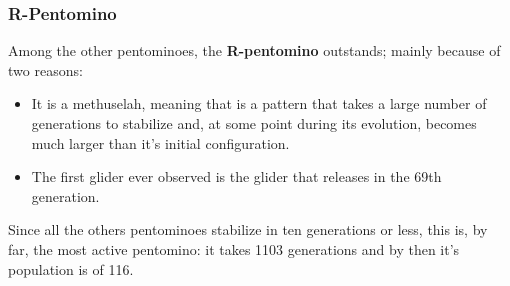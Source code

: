 \subsubsection{R-Pentomino}
Among the other pentominoes, the \textbf{R-pentomino} outstands; mainly because
of two reasons:
	\begin{itemize}
		\item It is a methuselah\footnotemark, meaning that is a pattern that takes a
			large number of generations to stabilize and, at some point during its
			evolution, becomes much larger than it's initial configuration.
		\item The first glider ever observed is the glider that releases in the
		 	69th generation.
	\end{itemize}
Since all the others pentominoes stabilize in ten generations or less, this is,
by far, the most active pentomino: it takes 1103 generations and by then it's
population is of 116.

